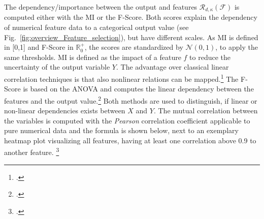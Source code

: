 The dependency/importance between the output and features $\mathcal{R}_{d,\kappa}(\mathcal{F})$ is computed either with the
\gls{MI} or the \gls{F-Score}. Both scores explain the dependency of numerical feature data to a categorical output value (see Fig.~\ref{fig:overview_Feature_selection}),
but have different scales. As \gls{MI} is defined in [0,1] and \gls{F-Score} in $\mathbb{R}_0^+$, the scores are standardized by $\mathcal{N}(0,1)$, to
apply the same thresholds. \gls{MI} is defined as the impact of a feature $f$ to reduce the uncertainty of the output variable $Y$.
The advantage over classical linear correlation techniques is that also nonlinear relations can be mapped.\footcite[cf.][pp.539-539]{battiti_using_1994}
The \gls{F-Score} is based on the \gls{ANOVA} and computes the linear dependency between the features and the output value.\footcite[cf.][p.2]{gu_generalized_2012}
Both methods are used to distinguish, if linear or non-linear dependencies exists between $X$ and $Y$. The mutual correlation between the variables
is computed with the \textit{Pearson} correlation coefficient applicable to pure numerical data and the formula is shown below,
next to an exemplary heatmap plot visualizing all features, having at least one correlation above 0.9 to another feature. \footcite[cf.][p.17]{chandrashekar_survey_2014}
